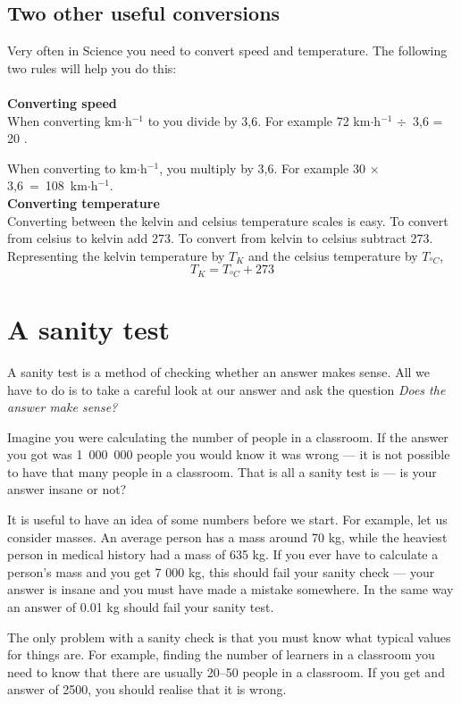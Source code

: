 \documentclass[10pt,a4paper,titlepage,twoside,openright]{report}
\begin{document}
\pagebreak[4]
\subsection{Two other useful conversions}
Very often in Science you need to convert speed and temperature. The following two rules will help you do this:\\
\\
{\bf{Converting speed}}\\
When converting km$\cdot$h$^{-1}$ to \ms you divide by 3,6. For example 72 km$\cdot$h$^{-1}$ $\div$~3,6 = 20 \ms.

When converting \ms to km$\cdot$h$^{-1}$, you multiply by 3,6. For example 30 \ms $\times$3,6~=~108~km$\cdot$h$^{-1}$.\\

{\bf{Converting temperature}}\\
Converting between the kelvin and celsius temperature scales is easy. To convert from celsius to kelvin add 273. To convert from kelvin to celsius subtract 273. Representing the kelvin temperature by $T_{K}$ and the celsius temperature by $T_{^oC}$,
\begin{equation*}
T_K = T_{^oC} + 273
\end{equation*}

\section{A sanity test}
A sanity test is a method of checking whether an answer makes sense. All we have to do is to take a careful look at our answer and ask the question \textit{Does the answer make sense?}

Imagine you were calculating the number of people in a classroom. If the answer you got was 1~000~000 people you would know it was wrong --- it is not possible to have that many people in a classroom. That is all a sanity test is --- is your answer insane or not? 

It is useful to have an idea of some numbers before we start. For example, let us consider masses. An average person has a mass around 70 kg, while the heaviest person in medical history had a mass of 635 kg. If you ever have to calculate a person's mass and you get 7 000 kg, this should fail your sanity check --- your answer is insane and you must have made a mistake somewhere. In the same way an answer of 0.01 kg should fail your sanity test.

The only problem with a sanity check is that you must know what typical values for things are. For example, finding the number of learners in a classroom you need to know that there are usually 20--50 people in a classroom. If you get and answer of 2500, you should realise that it is wrong. 
\end{document}
